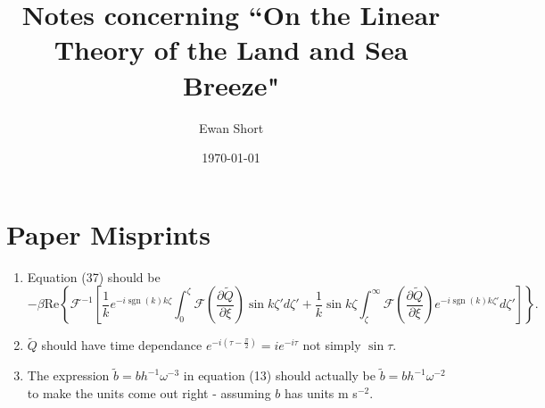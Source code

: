 \documentclass[12pt]{article}
\title{Notes concerning ``On the Linear Theory of the Land and Sea Breeze"  \citep{rotunno83}}
\author{Ewan Short}
\date{\today}
\DeclareMathOperator{\sgn}{sgn}
\begin{document}
\maketitle

\section{Paper Misprints}
\begin{enumerate}
\item
Equation (37) should be 
\begin{equation*}
 -\beta \textrm{Re}\left\{ \mathcal{F}^{-1}\left[ \frac{1}{k}e^{-i\sgn(k) k \zeta} \int_0^\zeta \mathcal{F}\left(\frac{\partial \tilde{Q}}{\partial \xi}\right) \sin k\zeta' d\zeta' + \frac{1}{k}\sin k \zeta \int_\zeta^\infty \mathcal{F}\left(\frac{\partial \tilde{Q}}{\partial \xi}\right) e^{-i\sgn(k)k\zeta'} d\zeta' \right] \right\}.
\end{equation*}
\item
$\tilde{Q}$ should have time dependance $e^{-i\left(\tau-\frac{\pi}{2}\right)}=ie^{-i\tau}$ not simply $\sin\tau$. 
\item
The expression $\tilde{b} = b h^{-1} \omega^{-3}$ in equation (13) should actually be $\tilde{b} = b h^{-1} \omega^{-2}$ to make the units come out right - assuming $b$ has units m s$^{-2}$.
\end{enumerate}
\end{document}
